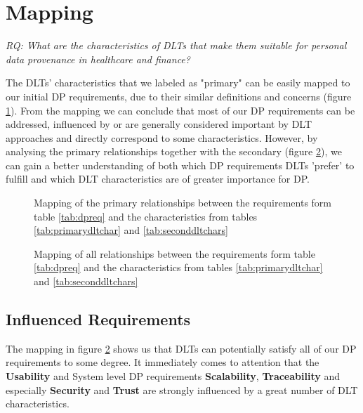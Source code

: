 \begin{table}[H]
    
\end{table}


\section{Mapping}
\label{sec:mapping}

\textit{RQ: What are the characteristics of DLTs that make them suitable for personal data provenance in healthcare and finance?} \newline

The DLTs' characteristics that we labeled as "primary" can be easily mapped to our initial DP requirements, due to their similar definitions and concerns (figure \ref{fig:mapprimary}). From the mapping we can conclude that most of our DP requirements can be addressed, influenced by or are generally considered important by DLT approaches and directly correspond to some characteristics. However, by analysing the primary relationships together with the secondary (figure \ref{fig:mapall}), we can gain a better understanding of both which DP requirements DLTs 'prefer' to fulfill and which DLT characteristics are of greater importance for DP.

\begin{figure}[H]
    \centering
    
    
    \caption{Mapping of the primary relationships between the requirements form table \ref{tab:dpreq} and the characteristics from tables \ref{tab:primarydltchar} and \ref{tab:seconddltchars}}
    \label{fig:mapprimary}
\end{figure}

\begin{figure}[H]
    \centering
    \caption{Mapping of all relationships between the requirements form table \ref{tab:dpreq} and the characteristics from tables \ref{tab:primarydltchar} and \ref{tab:seconddltchars}}
    
    
    \label{fig:mapall}
\end{figure}

\subsection{Influenced Requirements}
\label{ssec:influencedrequirements}

The mapping in figure \ref{fig:mapall} shows us that DLTs can potentially satisfy all of our DP requirements to some degree. It immediately comes to attention that the \textbf{Usability} and System level DP requirements \textbf{Scalability}, \textbf{Traceability} and especially \textbf{Security} and \textbf{Trust} are strongly influenced by a great number of DLT characteristics. 

